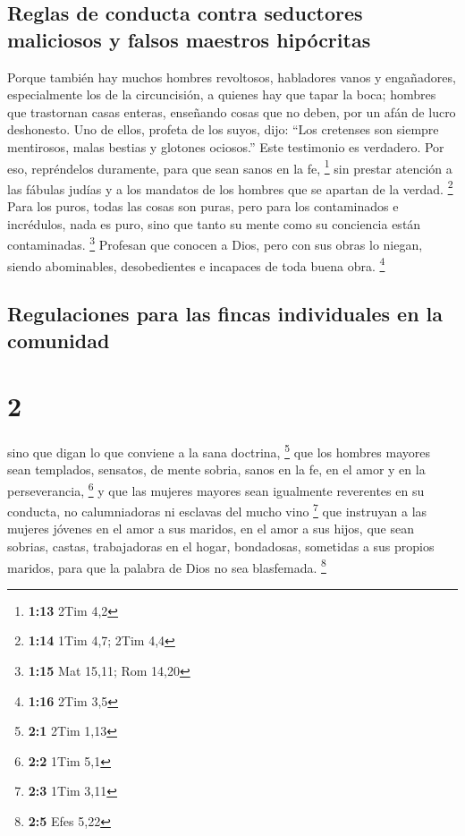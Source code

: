 \hypertarget{reglas-de-conducta-contra-seductores-maliciosos-y-falsos-maestros-hipuxf3critas}{%
\subsection{Reglas de conducta contra seductores maliciosos y falsos
maestros
hipócritas}\label{reglas-de-conducta-contra-seductores-maliciosos-y-falsos-maestros-hipuxf3critas}}

 Porque también hay muchos hombres revoltosos, habladores
vanos y engañadores, especialmente los de la circuncisión,
 a quienes hay que tapar la boca; hombres que trastornan
casas enteras, enseñando cosas que no deben, por un afán de lucro
deshonesto.  Uno de ellos, profeta de los suyos, dijo:
``Los cretenses son siempre mentirosos, malas bestias y glotones
ociosos.''  Este testimonio es verdadero. Por eso,
repréndelos duramente, para que sean sanos en la fe, \footnote{\textbf{1:13}
  2Tim 4,2}  sin prestar atención a las fábulas judías y
a los mandatos de los hombres que se apartan de la verdad. \footnote{\textbf{1:14}
  1Tim 4,7; 2Tim 4,4}  Para los puros, todas las cosas
son puras, pero para los contaminados e incrédulos, nada es puro, sino
que tanto su mente como su conciencia están contaminadas. \footnote{\textbf{1:15}
  Mat 15,11; Rom 14,20}  Profesan que conocen a Dios,
pero con sus obras lo niegan, siendo abominables, desobedientes e
incapaces de toda buena obra. \footnote{\textbf{1:16} 2Tim 3,5}

\hypertarget{regulaciones-para-las-fincas-individuales-en-la-comunidad}{%
\subsection{Regulaciones para las fincas individuales en la
comunidad}\label{regulaciones-para-las-fincas-individuales-en-la-comunidad}}

\hypertarget{section-1}{%
\section{2}\label{section-1}}

 sino que digan lo que conviene a la sana doctrina,
\footnote{\textbf{2:1} 2Tim 1,13}  que los hombres mayores
sean templados, sensatos, de mente sobria, sanos en la fe, en el amor y
en la perseverancia, \footnote{\textbf{2:2} 1Tim 5,1}  y
que las mujeres mayores sean igualmente reverentes en su conducta, no
calumniadoras ni esclavas del mucho vino \footnote{\textbf{2:3} 1Tim
  3,11}  que instruyan a las mujeres jóvenes en el amor a
sus maridos, en el amor a sus hijos,  que sean sobrias,
castas, trabajadoras en el hogar, bondadosas, sometidas a sus propios
maridos, para que la palabra de Dios no sea blasfemada. \footnote{\textbf{2:5}
  Efes 5,22}

